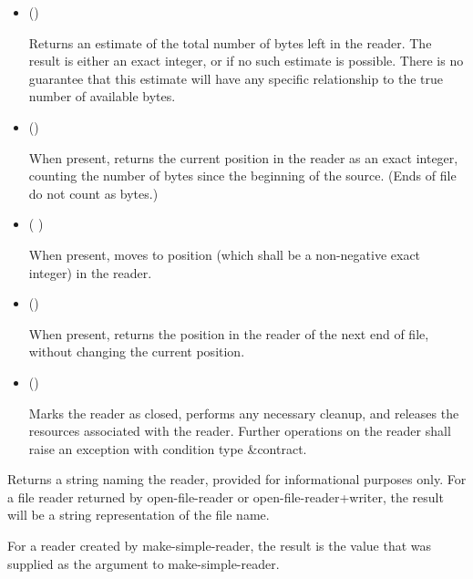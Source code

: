 \begin{entry}{%
}
\begin{itemize}
   may or may not be a bytes object returned by {\cf
    make-i/o-buffer}, but  may operate
  more efficiently if it is.
  
   may or may not be the same as the chunk size of the
  reader, but  may operate more
  efficiently if it is.

\item {\cf ()}
       
  Returns an estimate of the total number of bytes left in the
  reader. The result is either an exact integer, or
  \schfalse{} if no such estimate is possible. There is no guarantee
  that this estimate will have any specific relationship to the true
  number of available bytes.

\item {\cf ()}
       
  When present, 
  returns the current position in the 
  reader as an exact integer, counting the number of bytes since the
  beginning of the source. (Ends of file do not count as bytes.)
  
\item {\cf ( )}
       
  When present,  moves to position  (which
  shall be a non-negative exact integer) in the reader.
       
\item {\cf ()}
       
  When present,  returns the position in the reader
  of the next end of file, without changing the current position.

\item {\cf ()}
       
  Marks the reader as closed, performs any necessary
  cleanup, and releases the resources associated with the reader.
  Further operations on the reader shall raise an exception with
  condition type {\cf\&contract}.
\end{itemize}

\end{entry}

\begin{entry}{%
}
   
Returns a string naming the reader, provided for informational
purposes only. For a file reader returned by {\cf open-file-reader} or
{\cf open-file-reader+writer}, the result will be a string representation of the file
name.
  
For a reader created by {\cf make-simple-reader}, the result is the value that was
supplied as the  argument to {\cf make-simple-reader}.
\end{entry}


